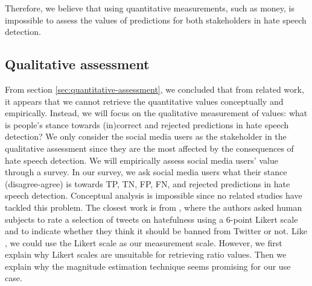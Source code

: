 %
Therefore, we believe that using quantitative measurements, such as money, is impossible to assess the values of predictions for both stakeholders in hate speech detection.
%

\subsection{Qualitative assessment}
From section \ref{sec:quantitative-assessment}, we concluded that from related work, it appears that we cannot retrieve the quantitative values conceptually and empirically.
%
Instead, we will focus on the qualitative measurement of values: what is people's stance towards (in)correct and rejected predictions in hate speech detection?
%
We only consider the social media users as the stakeholder in the qualitative assessment since they are the most affected by the consequences of hate speech detection.
%
We will empirically assess social media users' value through a survey.
%
In our survey, we ask social media users what their stance (disagree-agree) is towards TP, TN, FP, FN, and rejected predictions in hate speech detection.
%
Conceptual analysis is impossible since no related studies have tackled this problem.
%
The closest work is from \citet{ross2017measuring}, where the authors asked human subjects to rate a selection of tweets on hatefulness using a 6-point Likert scale and to indicate whether they think it should be banned from Twitter or not.
%
Like \citet{ross2017measuring}, we could use the Likert scale as our measurement scale.
%
However, we first explain why Likert scales are unsuitable for retrieving ratio values.
%
Then we explain why the magnitude estimation technique seems promising for our use case.

